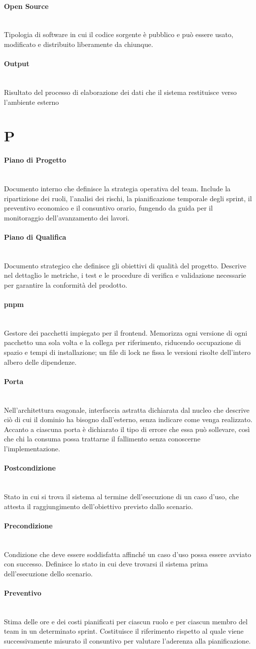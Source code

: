 \documentclass[a4paper, 10pt, colorlinks=true, linkcolor=black, urlcolor=blue, citecolor=blue, hidelinks]{article}
\newcommand{\glossaryterm}[2]{
    \paragraph{#1 \label{term:#1}} \mbox{} \\
    #2
    \vspace{0.5em}
}
\begin{document}
\glossaryterm{Open Source}{Tipologia di software in cui il codice sorgente è pubblico e può essere usato, modificato e distribuito liberamente da chiunque.}

\glossaryterm{Output}{Risultato del processo di elaborazione dei dati che il sistema restituisce verso l'ambiente esterno}

\newpage

\section*{P}

\glossaryterm{Piano di Progetto}{Documento interno che definisce la strategia operativa del team. Include la ripartizione dei ruoli, l'analisi dei rischi, la pianificazione temporale degli sprint, il preventivo economico e il consuntivo orario, fungendo da guida per il monitoraggio dell'avanzamento dei lavori.}

\glossaryterm{Piano di Qualifica}{Documento strategico che definisce gli obiettivi di qualità del progetto. Descrive nel dettaglio le metriche, i test e le procedure di verifica e validazione necessarie per garantire la conformità del prodotto.}

\glossaryterm{pnpm}{Gestore dei pacchetti impiegato per il frontend. Memorizza ogni versione di ogni pacchetto una sola volta e la collega per riferimento, riducendo occupazione di spazio e tempi di installazione; un file di lock ne fissa le versioni risolte dell'intero albero delle dipendenze.}

\glossaryterm{Porta}{Nell'architettura esagonale, interfaccia astratta dichiarata dal nucleo che descrive ciò di cui il dominio ha bisogno dall'esterno, senza indicare come venga realizzato. Accanto a ciascuna porta è dichiarato il tipo di errore che essa può sollevare, così che chi la consuma possa trattarne il fallimento senza conoscerne l'implementazione.}

\glossaryterm{Postcondizione}{Stato in cui si trova il sistema al termine dell'esecuzione di un caso d'uso, che attesta il raggiungimento dell'obiettivo previsto dallo scenario.}

\glossaryterm{Precondizione}{Condizione che deve essere soddisfatta affinché un caso d'uso possa essere avviato con successo. Definisce lo stato in cui deve trovarsi il sistema prima dell'esecuzione dello scenario.}

\glossaryterm{Preventivo}{Stima delle ore e dei costi pianificati per ciascun ruolo e per ciascun membro del team in un determinato sprint. Costituisce il riferimento rispetto al quale viene successivamente misurato il consuntivo per valutare l'aderenza alla pianificazione.}
\end{document}
